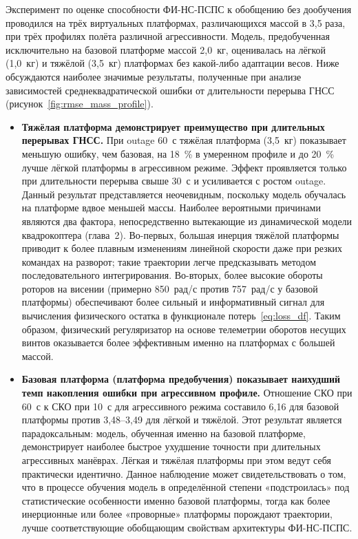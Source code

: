 Эксперимент по оценке способности ФИ-НС-ПСПС к обобщению без дообучения проводился на трёх виртуальных платформах, различающихся массой в 3,5 раза, при трёх профилях полёта различной агрессивности. Модель, предобученная исключительно на базовой платформе массой 2,0~кг, оценивалась на лёгкой (1,0~кг) и тяжёлой (3,5~кг) платформах без какой-либо адаптации весов. Ниже обсуждаются наиболее значимые результаты, полученные при анализе зависимостей среднеквадратической ошибки от длительности перерыва ГНСС (рисунок~\ref{fig:rmse_mass_profile}).

\begin{itemize}
	\item \textbf{Тяжёлая платформа демонстрирует преимущество при длительных перерывах ГНСС.}  
	При outage 60~с тяжёлая платформа (3,5~кг) показывает меньшую ошибку, чем базовая, на 18~\% в умеренном профиле и до 20~\% лучше лёгкой платформы в агрессивном режиме. Эффект проявляется только при длительности перерыва свыше 30~с и усиливается с ростом outage. Данный результат представляется неочевидным, поскольку модель обучалась на платформе вдвое меньшей массы. Наиболее вероятными причинами являются два фактора, непосредственно вытекающие из динамической модели квадрокоптера (глава~2). Во-первых, большая инерция тяжёлой платформы приводит к более плавным изменениям линейной скорости даже при резких командах на разворот; такие траектории легче предсказывать методом последовательного интегрирования. Во-вторых, более высокие обороты роторов на висении (примерно 850~рад/с против 757~рад/с у базовой платформы) обеспечивают более сильный и информативный сигнал для вычисления физического остатка в функционале потерь~\eqref{eq:loss_df}. Таким образом, физический регуляризатор на основе телеметрии оборотов несущих винтов оказывается более эффективным именно на платформах с большей массой.
	
	\item \textbf{Базовая платформа (платформа предобучения) показывает наихудший темп накопления ошибки при агрессивном профиле.}  
	Отношение СКО при 60~с к СКО при 10~с для агрессивного режима составило 6,16 для базовой платформы против 3,48–3,49 для лёгкой и тяжёлой. Этот результат является парадоксальным: модель, обученная именно на базовой платформе, демонстрирует наиболее быстрое ухудшение точности при длительных агрессивных манёврах. Лёгкая и тяжёлая платформы при этом ведут себя практически идентично. Данное наблюдение может свидетельствовать о том, что в процессе обучения модель в определённой степени «подстроилась» под статистические особенности именно базовой платформы, тогда как более инерционные или более «проворные» платформы порождают траектории, лучше соответствующие обобщающим свойствам архитектуры ФИ-НС-ПСПС.
	

\end{itemize}
